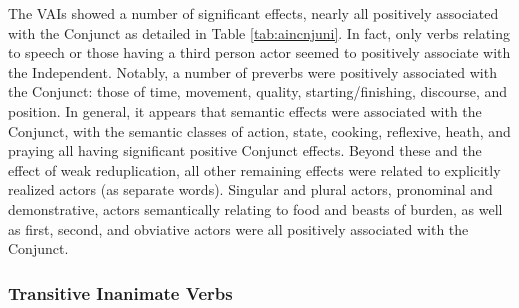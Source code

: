 The VAIs showed a number of significant effects, nearly all positively associated with the Conjunct as detailed in Table \ref{tab:aincnjuni}. In fact, only verbs relating to speech or those having a third person actor seemed to positively associate with the Independent. Notably, a number of preverbs were positively associated with the Conjunct: those of time, movement, quality, starting/finishing, discourse, and position. In general, it appears that semantic effects were associated with the Conjunct, with the semantic classes of action, state, cooking, reflexive, heath, and praying all having significant positive Conjunct effects. Beyond these and the effect of weak reduplication, all other remaining effects were related to explicitly realized actors (as separate words). Singular and plural actors, pronominal and demonstrative, actors semantically relating to food and beasts of burden, as well as first, second, and obviative actors were all positively associated with the Conjunct. 
\FloatBarrier




\FloatBarrier

\subsubsection{Transitive Inanimate Verbs}


